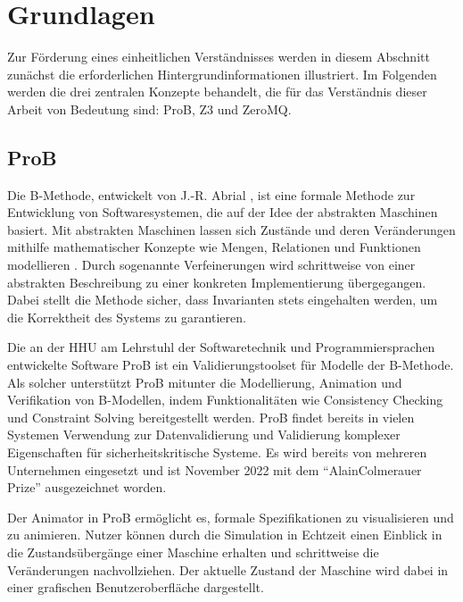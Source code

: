 
\section{Grundlagen}

Zur Förderung eines einheitlichen Verständnisses werden in diesem Abschnitt zunächst die erforderlichen Hintergrundinformationen illustriert.
Im Folgenden werden die drei zentralen Konzepte behandelt, die für das Verständnis dieser Arbeit von Bedeutung sind: ProB, Z3 und ZeroMQ.

\subsection{ProB}
Die B-Methode, entwickelt von J.-R. Abrial \cite{abrial1996b}, ist eine formale Methode zur Entwicklung von Softwaresystemen,
die auf der Idee der abstrakten Maschinen basiert.
Mit abstrakten Maschinen lassen sich Zustände und deren Veränderungen mithilfe mathematischer Konzepte wie Mengen,
Relationen und Funktionen modellieren \cite{leuschel2003prob}.
Durch sogenannte Verfeinerungen wird schrittweise von einer abstrakten Beschreibung zu einer konkreten Implementierung übergegangen.
Dabei stellt die Methode sicher, dass Invarianten stets eingehalten werden,
um die Korrektheit des Systems zu garantieren.

Die an der HHU am Lehrstuhl der Softwaretechnik und Programmiersprachen entwickelte Software ProB \cite{leuschel2003prob} ist ein Validierungstoolset für Modelle der B-Methode.
Als solcher unterstützt ProB mitunter die Modellierung, Animation und Verifikation von B-Modellen,
indem Funktionalitäten wie Consistency Checking und Constraint Solving bereitgestellt werden.
ProB findet bereits in vielen Systemen Verwendung zur Datenvalidierung und Validierung komplexer Eigenschaften für sicherheitskritische Systeme.
Es wird bereits von mehreren Unternehmen eingesetzt und ist November 2022 mit dem \enquote{AlainColmerauer Prize} ausgezeichnet worden.

Der Animator in ProB ermöglicht es, formale Spezifikationen zu visualisieren und zu animieren.
Nutzer können durch die Simulation in Echtzeit einen Einblick in die Zustandsübergänge einer Maschine erhalten und schrittweise die Veränderungen nachvollziehen.
Der aktuelle Zustand der Maschine wird dabei in einer grafischen Benutzeroberfläche dargestellt.

